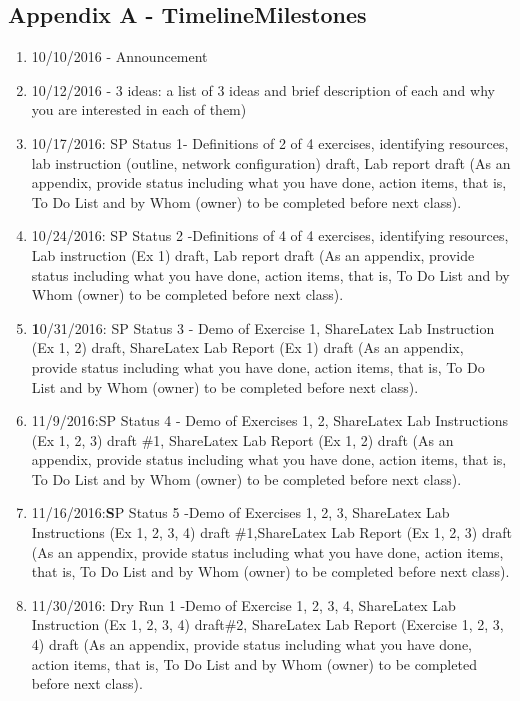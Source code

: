 \documentclass[main.tex]{subfiles}
\begin{document}
\subsection{Appendix A -  Timeline\/Milestones}
\label{sec: A}
\begin{enumerate}
    
\item 10/10/2016 - Announcement

\item 10/12/2016 - 3 ideas:   a list of 3 ideas and brief description of each and why you are interested in each of them)

\item 10/17/2016: SP Status 1- Definitions of 2 of 4 exercises, identifying resources, lab instruction (outline, network configuration) draft, Lab report draft (As an appendix, provide status including what you have done, action items, that is, To Do List and by Whom (owner) to be completed before next class).

\item 10/24/2016: SP Status 2 -Definitions of 4 of 4 exercises, identifying resources,  Lab instruction (Ex 1) draft,  Lab report draft (As an appendix, provide status including what you have done, action items, that is, To Do List and by Whom (owner) to be completed before next class).

\item \textbf 10/31/2016: SP Status 3 - Demo of Exercise 1, ShareLatex Lab Instruction (Ex 1, 2) draft, ShareLatex Lab Report (Ex 1) draft (As an appendix, provide status including what you have done, action items, that is, To Do List and by Whom (owner) to be completed before next class).

\item 11/9/2016:SP Status 4 - Demo of Exercises 1, 2, ShareLatex Lab Instructions (Ex 1, 2, 3) draft \#1, ShareLatex Lab Report (Ex 1, 2) draft (As an appendix, provide status including what you have done, action items, that is, To Do List and by Whom (owner) to be completed before next class). 

\item 11/16/2016:{\large \textbf SP Status 5 -Demo of Exercises 1, 2, 3, ShareLatex Lab Instructions (Ex 1, 2, 3, 4) draft \#1,ShareLatex Lab Report (Ex 1, 2, 3) draft (As an appendix, provide status including what you have done, action items, that is, To Do List and by Whom (owner) to be completed before next class).}
\item 11/30/2016: Dry Run 1 -Demo of Exercise 1, 2, 3, 4, ShareLatex Lab Instruction (Ex 1, 2, 3, 4) draft\#2, ShareLatex Lab Report (Exercise 1, 2, 3, 4) draft (As an appendix, provide status including what you have done, action items, that is, To Do List and by Whom (owner) to be completed before next class).


\end{enumerate}
\end{document}
